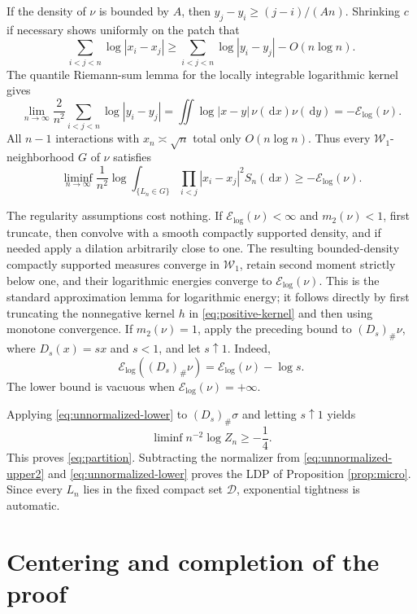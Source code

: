 \documentclass[11pt]{article}
\newcommand{\W}{\mathcal W}
\newcommand{\E}{\mathcal E_{\log}}
\newcommand{\dd}{\,\mathrm d}
\begin{document}
If the density of $\nu$ is bounded by $A$, then
$y_j-y_i\ge (j-i)/(An)$. Shrinking $c$ if necessary shows uniformly on the
patch that
\[
 \sum_{i<j<n}\log|x_i-x_j|
 \ge \sum_{i<j<n}\log|y_i-y_j|-O(n\log n).
\]
The quantile Riemann-sum lemma for the locally integrable logarithmic kernel
gives
\begin{equation}\label{eq:riemann}
 \lim_{n\to\infty}\frac2{n^2}
 \sum_{i<j<n}\log|y_i-y_j|
 =\iint\log|x-y|\,\nu(\dd x)\nu(\dd y)=-\E(\nu).
\end{equation}
All $n-1$ interactions with $x_n\asymp\sqrt n$ total only $O(n\log n)$.
Thus every $\W_1$-neighborhood $G$ of $\nu$ satisfies
\begin{equation}\label{eq:unnormalized-lower}
 \liminf_{n\to\infty}\frac1{n^2}\log
 \int_{\{L_n\in G\}}\prod_{i<j}|x_i-x_j|^2S_n(\dd x)
 \ge-\E(\nu).
\end{equation}

The regularity assumptions cost nothing. If $\E(\nu)<\infty$ and
$m_2(\nu)<1$, first truncate, then convolve with a smooth compactly supported
density, and if needed apply a dilation arbitrarily close to one. The
resulting bounded-density compactly supported measures converge in $\W_1$,
retain second moment strictly below one, and their logarithmic energies
converge to $\E(\nu)$. This is the standard approximation lemma for
logarithmic energy; it follows directly by first truncating the nonnegative
kernel $h$ in \eqref{eq:positive-kernel} and then using monotone convergence.
If $m_2(\nu)=1$, apply the preceding bound to
$(D_s)_{\#}\nu$, where $D_s(x)=sx$ and $s<1$, and let $s\uparrow1$. Indeed,
\begin{equation}\label{eq:dilation-energy}
 \E((D_s)_{\#}\nu)=\E(\nu)-\log s.
\end{equation}
The lower bound is vacuous when $\E(\nu)=+\infty$.

Applying \eqref{eq:unnormalized-lower} to $(D_s)_{\#}\sigma$ and letting
$s\uparrow1$ yields
\[
 \liminf n^{-2}\log Z_n\ge-\frac14.
\]
This proves \eqref{eq:partition}. Subtracting the normalizer from
\eqref{eq:unnormalized-upper2} and \eqref{eq:unnormalized-lower} proves the
LDP of Proposition \ref{prop:micro}. Since every $L_n$ lies in the fixed
compact set $\mathcal D$, exponential tightness is automatic.

\section{Centering and completion of the proof}
\end{document}
